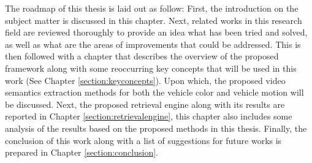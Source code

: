 The roadmap of this thesis is laid out as follow: First, the introduction on the subject matter is discussed in this chapter. Next, related works in this research field are reviewed thoroughly to provide an idea what has been tried and solved, as well as what are the areas of improvements that could be addressed. This is then followed with a chapter that describes the overview of the proposed framework along with some reoccurring key concepts that will be used in this work (See Chapter \ref{section:keyconcepts}). Upon which, the proposed video semantics extraction methods for both the vehicle color and vehicle motion will be discussed. Next, the proposed retrieval engine along with its results are reported in Chapter \ref{section:retrievalengine}, this chapter also includes some analysis of the results based on the proposed methods in this thesis. Finally, the conclusion of this work along with a list of suggestions for future works is prepared in Chapter \ref{section:conclusion}. 

